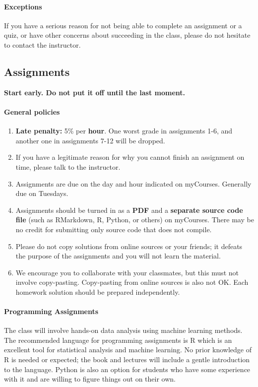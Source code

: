 \documentclass[11pt]{article}
\begin{document}
\paragraph*{Exceptions} If you have a serious reason for not being able to complete an assignment or a quiz, or have other concerns about succeeding in the class, please do not hesitate to contact the instructor.


\subsection{Assignments}
\textbf{Start early. Do not put it off until the last moment.}

\paragraph{General policies}

\begin{enumerate}[nosep]
	\item \textbf{Late penalty:} 5\% per \textbf{hour}. One worst grade in assignments 1-6, and another one in assignments 7-12 will be dropped.
	\item If you have a legitimate reason for why you cannot finish an assignment on time, please talk to the instructor.
	\item Assignments are due on the day and hour indicated on myCourses. Generally due on Tuesdays.
	\item Assignments should be turned in as a \textbf{PDF} and a \textbf{separate source code file} (such as RMarkdown, R, Python, or others) on myCourses. There may be no credit for submitting only source code that does not compile.
	\item Please do not copy solutions from online sources or your friends; it defeats the purpose of the assignments and you will not learn the material.
	\item We encourage you to collaborate with your classmates, but this must not involve copy-pasting. Copy-pasting from online sources is also not OK. Each homework solution should be prepared independently.
\end{enumerate}

\paragraph*{Programming Assignments}

The class will involve hands-on data analysis using machine learning methods. The recommended language for programming assignments is R which is an excellent tool for statistical analysis and machine learning. No prior knowledge of R is needed or expected; the book and lectures will include a gentle introduction to the language. Python is also an option for students who have some experience with it and are willing to figure things out on their own.
\end{document}
